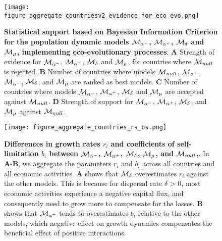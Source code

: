 \begin{figure}
  \center
  \texttt{[image: figure\_aggregate\_countriesv2\_evidence\_for\_eco\_evo.png]}
  \caption{\small \textbf{Statistical support based on Bayesian Information Criterion for the population dynamic models $\mathcal{M}_{\alpha^-}$, $\mathcal{M}_{\alpha^+}$, $\mathcal{M}_\delta$ and $\mathcal{M}_\mu$, implementing eco-evolutionary processes}. 
  \textbf{A} Strength of evidence for $\mathcal{M}_{\alpha^-}$, $\mathcal{M}_{\alpha^+}$, $\mathcal{M}_\delta$ and $\mathcal{M}_\mu$, for countries where $\mathcal{M}_{null}$ is rejected. 
  \textbf{B} Number of countries where models $\mathcal{M}_{null}$, $\mathcal{M}_{\alpha^+}$, $\mathcal{M}_{\alpha^-}$, $\mathcal{M}_\delta$, and $\mathcal{M}_\mu$ are ranked as best models. 
  \textbf{C} Number of countries where models $\mathcal{M}_{\alpha^-}$, $\mathcal{M}_{\alpha^+}$, $\mathcal{M}_\delta$ and $\mathcal{M}_\mu$ are accepted against $\mathcal{M}_{null}$.
  \textbf{D} Strength of support for $\mathcal{M}_{\alpha^-}$, $\mathcal{M}_{\alpha^+}$, $\mathcal{M}_\delta$, and $\mathcal{M}_\mu$ against $\mathcal{M}_{null}$.
  }\label{fig:aggregate_countries}
\end{figure}
\FloatBarrier




\begin{figure}
  \center
  \texttt{[image: figure\_aggregate\_countries\_rs\_bs.png]}
  \caption{\small \textbf{Differences in growth rates $r_i$ and coefficients of self-limitation $b_i$ between $\mathcal{M}_{\alpha^-}$, $\mathcal{M}_{\alpha^+}$, $\mathcal{M}_\delta$, $\mathcal{M}_\mu$, and $\mathcal{M}_{null}$,}. In \textbf{A}-\textbf{B}, we aggregate the parameters $r_i$ and $b_i$ across all countries and all economic activities. \textbf{A} shows that $\mathcal{M}_\delta$ overestimates $r_i$ against the other models. This is because for dispersal rate $\delta$ > 0, most economic activities experience a negative capital flux, and consequently need to grow more to compensate for the losses. \textbf{B} shows that $\mathcal{M}_{\alpha^+}$ tends to overestimates $b_i$ relative to the other models, which negative effect on growth dynamics compensates the beneficial effect of positive interactions.
   }\label{fig:r_b}
\end{figure}
\FloatBarrier


